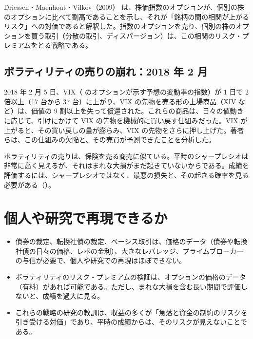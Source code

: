 Driessen・Maenhout・Vilkov（2009）\cite{dmv2009} は、株価指数のオプションが、個別の株のオプションに比べて割高であることを示し、それが「銘柄の間の相関が上がるリスク」への対価であると解釈した。指数のオプションを売り、個別の株のオプションを買う取引（分散の取引、ディスパージョン）は、この相関のリスク・プレミアムをとる戦略である。

\subsection{ボラティリティの売りの崩れ：2018 年 2 月}

\begin{paperbox}
2018 年 2 月 5 日、VIX（\SP{} のオプションが示す予想の変動率の指数）が 1 日で 2 倍以上（17 台から 37 台）に上がり、VIX の先物を売る形の上場商品（XIV など）は、価値の 9 割以上を失って償還された。これらの商品は、日々の値動きに応じて、引けにかけて VIX の先物を機械的に買い戻す仕組みだった。VIX が上がると、その買い戻しの量が膨らみ、VIX の先物をさらに押し上げた。著者らは、この仕組みの欠陥と、その売買が予測できたことを分析した。
\end{paperbox}

ボラティリティの売りは、保険を売る商売に似ている。平時のシャープレシオは非常に高く見えるが、それはまれな大損がまだ起きていないからである。成績を評価するには、シャープレシオではなく、最悪の損失と、その起きる確率を見る必要がある（）。

\section{個人や研究で再現できるか}

\begin{itemize}
\item 債券の裁定、転換社債の裁定、ベーシス取引は、価格のデータ（債券や転換社債の日々の価格、レポの金利）、大きなレバレッジ、プライムブローカーの与信が必要で、個人や研究での再現はほぼできない。
\item ボラティリティのリスク・プレミアムの検証は、オプションの価格のデータ（有料）があれば可能である。ただし、まれな大損を含む長い期間で評価しないと、成績を過大に見る。
\item これらの戦略の研究の教訓は、収益の多くが「急落と資金の制約のリスクを引き受ける対価」であり、平時の成績からは、そのリスクが見えないことである。
\end{itemize}

